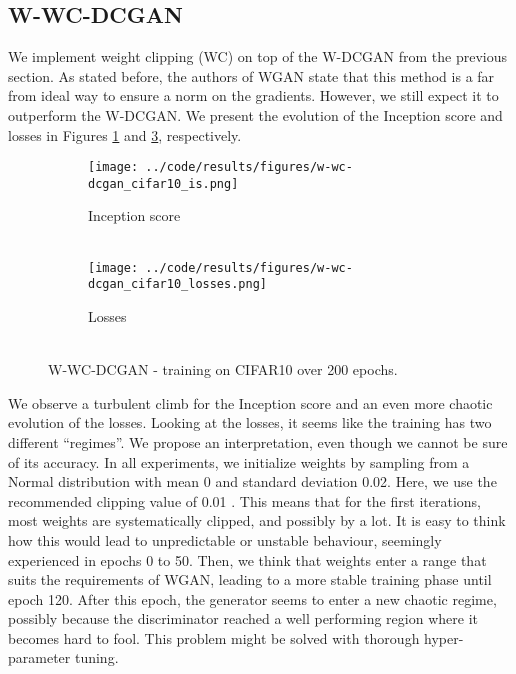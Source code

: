 \subsection{W-WC-DCGAN}
\label{sec:exp-w-wc-dcgan}
We implement weight clipping (WC) on top of the W-DCGAN from the previous section. As stated before, the authors of WGAN state that this method is a far from ideal way to ensure a norm on the gradients. However, we still expect it to outperform the W-DCGAN. We present the evolution of the Inception score and losses in Figures \ref{fig:exp-w-wc-dcgan-is} and \ref{fig:exp-w-wc-dcgan-losses}, respectively. %
\begin{figure}[H]
    \centering
    \begin{subfigure}[t]{0.49\textwidth}
        \centering
		\texttt{[image: ../code/results/figures/w-wc-dcgan\_cifar10\_is.png]}
		\caption{Inception score\\~}
		\label{fig:exp-w-wc-dcgan-is}
    \end{subfigure}
    \begin{subfigure}[t]{0.49\textwidth}
        \centering
        \texttt{[image: ../code/results/figures/w-wc-dcgan\_cifar10\_losses.png]}
		\caption{Losses\\~}
		\label{fig:exp-w-wc-dcgan-losses}
    \end{subfigure}
    \caption{W-WC-DCGAN - training on CIFAR10 over 200 epochs.}
\end{figure}%
We observe a turbulent climb for the Inception score and an even more chaotic evolution of the losses. Looking at the losses, it seems like the training has two different ``regimes''. We propose an interpretation, even though we cannot be sure of its accuracy. In all experiments, we initialize weights by sampling from a Normal distribution with mean 0 and standard deviation 0.02. Here, we use the recommended clipping value of 0.01 \cite{arjovsky2017wasserstein}. This means that for the first iterations, most weights are systematically clipped, and possibly by a lot. It is easy to think how this would lead to unpredictable or unstable behaviour, seemingly experienced in epochs 0 to 50. Then, we think that weights enter a range that suits the requirements of WGAN, leading to a more stable training phase until epoch 120. After this epoch, the generator seems to enter a new chaotic regime, possibly because the discriminator reached a well performing region where it becomes hard to fool. This problem might be solved with thorough hyper-parameter tuning.